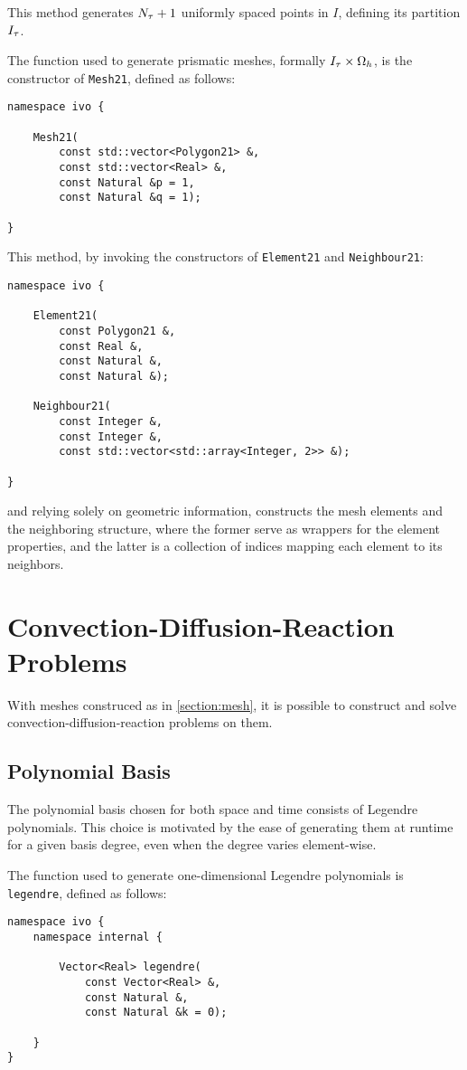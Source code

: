 This method generates $N_{\tau} + 1$ uniformly spaced points in $I$, defining its partition $I_{\tau}$.

The function used to generate prismatic meshes, formally $I_{\tau} \times \Omega_{h}$, is the constructor of \lstinline{Mesh21}, defined as follows:
\begin{lstlisting}[style=cpp]
namespace ivo {

    Mesh21(
        const std::vector<Polygon21> &, 
        const std::vector<Real> &, 
        const Natural &p = 1, 
        const Natural &q = 1);

}
\end{lstlisting}

This method, by invoking the constructors of \lstinline{Element21} and \lstinline{Neighbour21}:
\begin{lstlisting}[style=cpp]
namespace ivo {

    Element21(
        const Polygon21 &, 
        const Real &, 
        const Natural &, 
        const Natural &);

    Neighbour21(
        const Integer &, 
        const Integer &, 
        const std::vector<std::array<Integer, 2>> &);

}
\end{lstlisting}
and relying solely on geometric information, constructs the mesh elements and the neighboring structure, where the former serve as wrappers for the element properties, and the latter is a collection of indices mapping each element to its neighbors.

\newpage
\section{Convection-Diffusion-Reaction Problems}

With meshes construced as in \cref{section:mesh}, it is possible to construct and solve convection-diffusion-reaction problems on them.

\subsection{Polynomial Basis}

The polynomial basis chosen for both space and time consists of Legendre polynomials. This choice is motivated by the ease of generating them at runtime for a given basis degree, even when the degree varies element-wise.

The function used to generate one-dimensional Legendre polynomials is \lstinline{legendre}, defined as follows:
\begin{lstlisting}[style=cpp]
namespace ivo {
    namespace internal {

        Vector<Real> legendre(
            const Vector<Real> &, 
            const Natural &, 
            const Natural &k = 0);

    }
}
\end{lstlisting}

